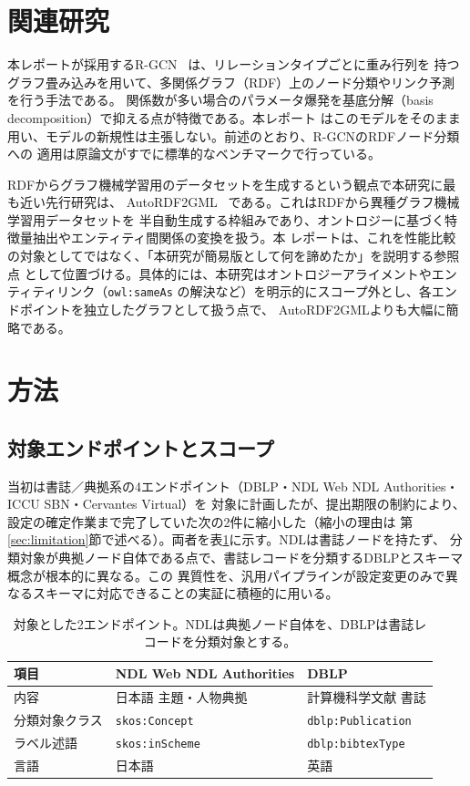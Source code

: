 \documentclass[dvipdfmx,twoside,11pt]{article}
\begin{document}
\section{関連研究}
\label{sec:related}

本レポートが採用するR-GCN~\citep{schlichtkrull2018modeling} は、リレーションタイプごとに重み行列を
持つグラフ畳み込みを用いて、多関係グラフ（RDF）上のノード分類やリンク予測を行う手法である。
関係数が多い場合のパラメータ爆発を基底分解（basis decomposition）で抑える点が特徴である。本レポート
はこのモデルをそのまま用い、モデルの新規性は主張しない。前述のとおり、R-GCNのRDFノード分類への
適用は原論文がすでに標準的なベンチマークで行っている。

RDFからグラフ機械学習用のデータセットを生成するという観点で本研究に最も近い先行研究は、
AutoRDF2GML~\citep{farber2024autordf2gml} である。これはRDFから異種グラフ機械学習用データセットを
半自動生成する枠組みであり、オントロジーに基づく特徴量抽出やエンティティ間関係の変換を扱う。本
レポートは、これを性能比較の対象としてではなく、「本研究が簡易版として何を諦めたか」を説明する参照点
として位置づける。具体的には、本研究はオントロジーアライメントやエンティティリンク（\texttt{owl:sameAs}
の解決など）を明示的にスコープ外とし、各エンドポイントを独立したグラフとして扱う点で、
AutoRDF2GMLよりも大幅に簡略である。

\section{方法}
\label{sec:method}

\subsection{対象エンドポイントとスコープ}

当初は書誌／典拠系の4エンドポイント（DBLP・NDL Web NDL Authorities・ICCU SBN・Cervantes Virtual）を
対象に計画したが、提出期限の制約により、設定の確定作業まで完了していた次の2件に縮小した（縮小の理由は
第\ref{sec:limitation}節で述べる）。両者を表\ref{tab:endpoints}に示す。NDLは書誌ノードを持たず、
分類対象が典拠ノード自体である点で、書誌レコードを分類するDBLPとスキーマ概念が根本的に異なる。この
異質性を、汎用パイプラインが設定変更のみで異なるスキーマに対応できることの実証に積極的に用いる。

\begin{table}[t]
\centering
\caption{対象とした2エンドポイント。NDLは典拠ノード自体を、DBLPは書誌レコードを分類対象とする。}
\label{tab:endpoints}
\begin{tabular}{lll}
\toprule
項目 & NDL Web NDL Authorities & DBLP \\
\midrule
内容 & 日本語 主題・人物典拠 & 計算機科学文献 書誌 \\
分類対象クラス & \texttt{skos:Concept} & \texttt{dblp:Publication} \\
ラベル述語 & \texttt{skos:inScheme} & \texttt{dblp:bibtexType} \\
言語 & 日本語 & 英語 \\
\bottomrule
\end{tabular}
\end{table}
\end{document}
